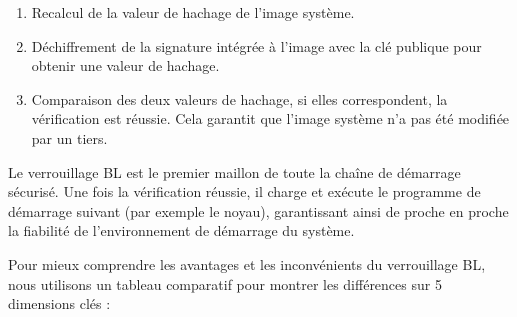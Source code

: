 \begin{enumerate}
  \item Recalcul de la valeur de hachage de l'image système.
  \item Déchiffrement de la signature intégrée à l'image avec la clé publique pour obtenir une valeur de hachage.
  \item Comparaison des deux valeurs de hachage, si elles correspondent, la vérification est réussie. Cela garantit que l'image système n'a pas été modifiée par un tiers.
\end{enumerate}


Le verrouillage BL est le premier maillon de toute la chaîne de démarrage sécurisé. Une fois la vérification réussie, il charge et exécute le programme de démarrage suivant (par exemple le noyau), garantissant ainsi de proche en proche la fiabilité de l'environnement de démarrage du système.


Pour mieux comprendre les avantages et les inconvénients du verrouillage BL, nous utilisons un tableau comparatif pour montrer les différences sur 5 dimensions clés :

